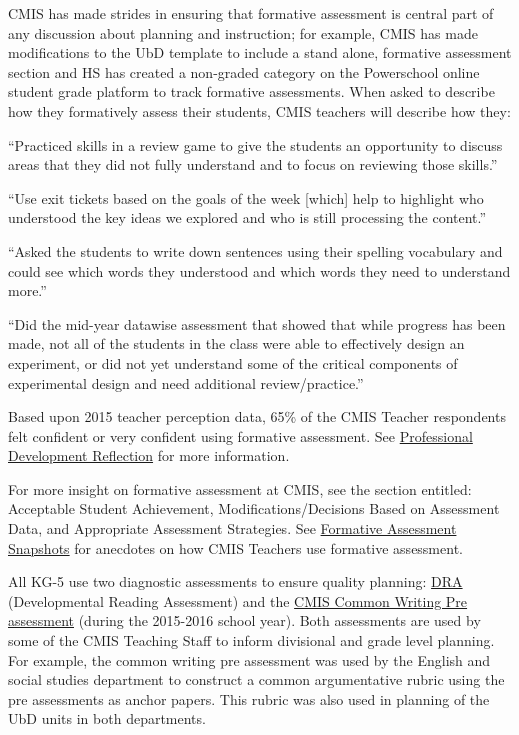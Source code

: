 \begin{findings}
CMIS has made strides in ensuring that formative assessment is central part of any discussion about planning and instruction; for example, CMIS has made modifications to the UbD template  to include a stand alone, formative assessment section and HS has created a non-graded category on the Powerschool online student grade platform to track formative assessments. When asked to describe how they formatively assess their students, CMIS teachers will describe how they:

``Practiced skills in a review game to give the students an opportunity to discuss areas that they did  not fully understand and to focus on reviewing those skills.''

``Use exit tickets based on the goals of the week [which] help to highlight who understood the key ideas we explored and who is still processing the content.''

``Asked the students to write down sentences using their spelling vocabulary and could see which words they understood and which words they need to understand more.''

``Did the mid-year datawise assessment that showed that while progress has been made, not all of the students in the class were able to effectively design an experiment, or did not yet understand some of the critical components of experimental design and need additional review/practice.''

Based upon 2015 teacher perception data, 65\% of the CMIS Teacher respondents felt confident or very confident using formative assessment. See \href{https://docs.google.com/a/cmis.ac.th/forms/d/1-00JLey-jyLuizymm8z8JGJ6iLp4l-ccsTgHJ_Ckcj8/viewanalytics}{Professional Development Reflection} for more information. 

For more insight on formative assessment at CMIS, see the section entitled: Acceptable Student Achievement, Modifications/Decisions Based on Assessment Data, and Appropriate Assessment Strategies. See \href{https://docs.google.com/a/cmis.ac.th/document/d/1yPhINDe21ApcJp3psbSCgmS9PHEBbxrCflrR2Adnwho/edit?usp=sharing}{Formative Assessment Snapshots} for anecdotes on how CMIS Teachers use formative assessment. 


All KG-5 use two diagnostic assessments to ensure quality planning: \href{https://drive.google.com/drive/folders/0ByVFfrm0zfolV29lcmM1WXVQOXc?usp=sharing}{DRA} (Developmental Reading Assessment) and the \href{https://drive.google.com/drive/folders/0ByVFfrm0zfolLU9Vb0ZBeF9uZjQ?usp=sharing}{CMIS Common Writing Pre assessment} (during the 2015-2016 school year). Both assessments are used by some of the CMIS Teaching Staff to inform divisional and grade level planning. For example, the common writing pre assessment was used by the English and social studies department to construct a common argumentative rubric using the pre assessments as anchor papers. This rubric was also used in planning of the UbD units in both departments. 


\end{findings}

